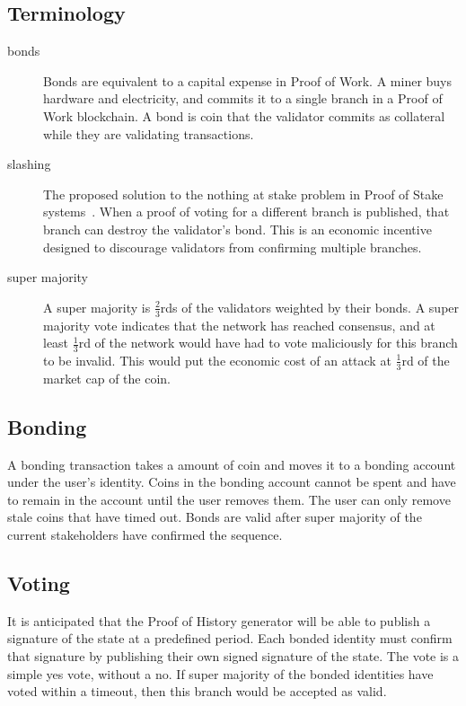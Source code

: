 \documentclass[12pt]{article}
\begin{document}
\subsection{Terminology}
\begin{description}

\item[bonds]
Bonds are equivalent to a capital expense in Proof of Work. A miner buys hardware and electricity, and commits it to a single branch in a Proof of Work blockchain. A bond is coin that the validator commits as collateral while they are validating transactions.

\item[slashing]

The proposed solution to the nothing at stake problem in Proof of Stake systems~\cite{slasher}. When a proof of voting for a different branch is published, that branch can destroy the validator’s bond. This is an economic incentive designed to discourage validators from confirming multiple branches.
\item[super majority]
A super majority is \(\frac{2}{3}\)rds of the validators weighted by their bonds. A super majority vote indicates that the network has reached consensus, and at least \(\frac{1}{3}\)rd of the network would have had to vote maliciously for this branch to be invalid. This would put the economic cost of an attack at \(\frac{1}{3}\)rd of the market cap of the coin.

\end{description}

\subsection{Bonding}
A bonding transaction takes a  amount of coin and moves it to a bonding account under the user’s identity. Coins in the bonding account cannot be spent and have to remain in the account until the user removes them. The user can only remove stale coins that have timed out. Bonds are valid after super majority of the current stakeholders have confirmed the sequence.

\subsection{Voting}
It is anticipated that the Proof of History generator will be able to publish a signature of the state at a predefined period. Each bonded identity must confirm that signature by publishing their own signed signature of the state. The vote is a simple yes vote, without a no. If super majority of the bonded identities have voted within a timeout, then this branch would be accepted as valid.
\end{document}
